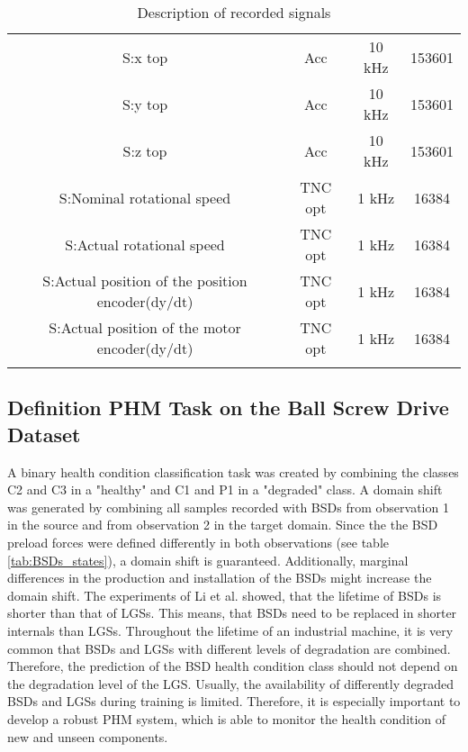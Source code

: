\begin{center}
\begin{longtable}{c c c c}
 S:x top & Acc & 10 kHz & 153601 \\ 

 S:y top & Acc & 10 kHz & 153601 \\ 
 
 S:z top & Acc & 10 kHz & 153601 \\ 
 
 S:Nominal rotational speed & TNC opt & 1 kHz & 16384 \\
 
 S:Actual rotational speed & TNC opt & 1 kHz & 16384 \\ 
 
 S:Actual position of the position encoder(dy/dt) & TNC opt & 1 kHz & 16384 \\ 
 S:Actual position of the motor encoder(dy/dt)  & TNC opt & 1 kHz & 16384  \\ [1ex] 
 \bottomrule
\caption {Description of recorded signals}
\label {tab:description_of_the_49_recorded_features}
\end{longtable}
\end{center}


\subsection{Definition PHM Task on the Ball Screw Drive Dataset}
A binary health condition classification task was created by combining the classes C2 and C3 in a "healthy" and C1 and P1 in a "degraded" class. A domain shift was generated by combining all samples recorded with BSDs from observation 1 in the source and from observation 2 in the target domain. Since the the BSD preload forces were defined differently in both observations (see table \ref{tab:BSDs_states}), a domain shift is guaranteed. Additionally, marginal differences in the production and installation of the BSDs might increase the domain shift. The experiments of Li et al. \cite{Li2018} showed, that the lifetime of BSDs is shorter than that of LGSs. This means, that BSDs need to be replaced in shorter internals than LGSs. Throughout the lifetime of an industrial machine, it is very common that BSDs and LGSs with different levels of degradation are combined. Therefore, the prediction of the BSD health condition class should not depend on the degradation level of the LGS. Usually, the availability of differently degraded BSDs and LGSs during training is limited. Therefore, it is especially important to develop a robust PHM system, which is able to monitor the health condition of new and unseen components.  

